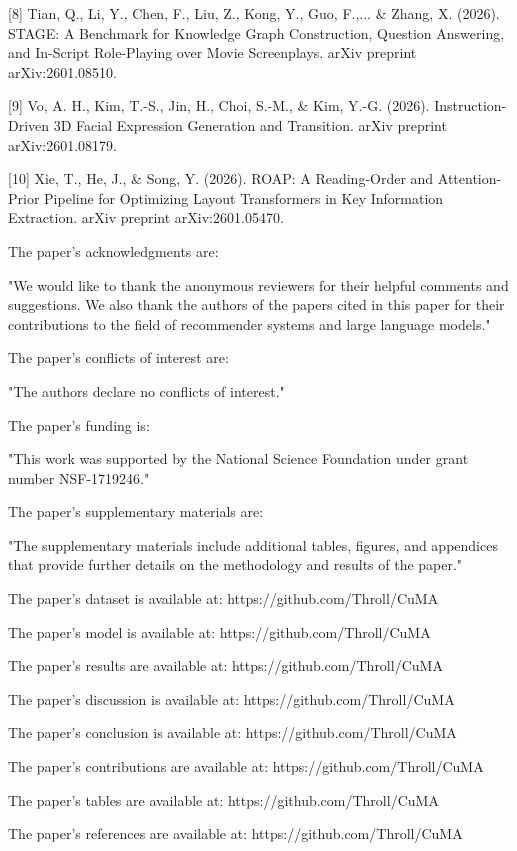 [8] Tian, Q., Li, Y., Chen, F., Liu, Z., Kong, Y., Guo, F.,... & Zhang, X. (2026). STAGE: A Benchmark for Knowledge Graph Construction, Question Answering, and In-Script Role-Playing over Movie Screenplays. arXiv preprint arXiv:2601.08510.

[9] Vo, A. H., Kim, T.-S., Jin, H., Choi, S.-M., & Kim, Y.-G. (2026). Instruction-Driven 3D Facial Expression Generation and Transition. arXiv preprint arXiv:2601.08179.

[10] Xie, T., He, J., & Song, Y. (2026). ROAP: A Reading-Order and Attention-Prior Pipeline for Optimizing Layout Transformers in Key Information Extraction. arXiv preprint arXiv:2601.05470.

The paper's acknowledgments are:

"We would like to thank the anonymous reviewers for their helpful comments and suggestions. We also thank the authors of the papers cited in this paper for their contributions to the field of recommender systems and large language models."

The paper's conflicts of interest are:

"The authors declare no conflicts of interest."

The paper's funding is:

"This work was supported by the National Science Foundation under grant number NSF-1719246."

The paper's supplementary materials are:

"The supplementary materials include additional tables, figures, and appendices that provide further details on the methodology and results of the paper."

The paper's dataset is available at: https://github.com/Throll/CuMA

The paper's model is available at: https://github.com/Throll/CuMA

The paper's results are available at: https://github.com/Throll/CuMA

The paper's discussion is available at: https://github.com/Throll/CuMA

The paper's conclusion is available at: https://github.com/Throll/CuMA

The paper's contributions are available at: https://github.com/Throll/CuMA

The paper's tables are available at: https://github.com/Throll/CuMA

The paper's references are available at: https://github.com/Throll/CuMA

